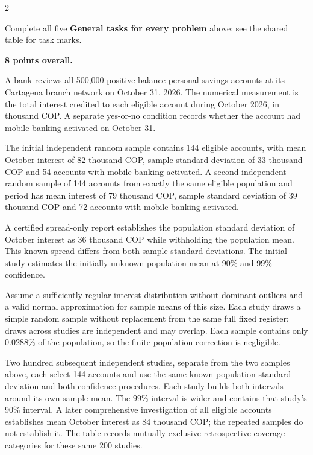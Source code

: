 \begin{multicols}{2}
\par\smallskip
Complete all five \textbf{General tasks for every problem} above; see the shared table for task marks.

\endgroup

\textbf{8 points overall.}

A bank reviews all 500,000 positive-balance personal savings accounts at its Cartagena branch network on October 31, 2026. The numerical measurement is the total interest credited to each eligible account during October 2026, in thousand COP. A separate yes-or-no condition records whether the account had mobile banking activated on October 31.

The initial independent random sample contains 144 eligible accounts, with mean October interest of 82 thousand COP, sample standard deviation of 33 thousand COP and 54 accounts with mobile banking activated. A second independent random sample of 144 accounts from exactly the same eligible population and period has mean interest of 79 thousand COP, sample standard deviation of 39 thousand COP and 72 accounts with mobile banking activated.

A certified spread-only report establishes the population standard deviation of October interest as 36 thousand COP while withholding the population mean. This known spread differs from both sample standard deviations. The initial study estimates the initially unknown population mean at 90\% and 99\% confidence.

Assume a sufficiently regular interest distribution without dominant outliers and a valid normal approximation for sample means of this size. Each study draws a simple random sample without replacement from the same full fixed register; draws across studies are independent and may overlap. Each sample contains only 0.0288\% of the population, so the finite-population correction is negligible.

Two hundred subsequent independent studies, separate from the two samples above, each select 144 accounts and use the same known population standard deviation and both confidence procedures. Each study builds both intervals around its own sample mean. The 99\% interval is wider and contains that study's 90\% interval. A later comprehensive investigation of all eligible accounts establishes mean October interest as 84 thousand COP; the repeated samples do not establish it. The table records mutually exclusive retrospective coverage categories for these same 200 studies.


\end{multicols}
